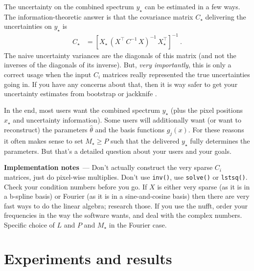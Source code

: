 \documentclass[11pt]{article}
\renewcommand{\paragraph}[1]{\medskip\par\noindent\textbf{#1}~---}
\begin{document}
The uncertainty on the combined spectrum $y_\star$ can be estimated in a few ways.
The information-theoretic answer is that the covariance matrix $C_\star$ delivering the uncertainties on $y_\star$ is
\begin{align}
    C_\star &= [X_\star\,(X^\top\,C^{-1}\,X)^{-1}\,X_\star^\top]^{-1} ~.
\end{align}
The naive uncertainty variances are the diagonals of this matrix (and not the inverses of the diagonals of its inverse).
But, \emph{very importantly}, this is only a correct usage when the input $C_i$ matrices really represented the true uncertainties going in.
If you have any concerns about that, then it is way safer to get your uncertainty estimates from bootstrap or jackknife \cite{hoggflexible}.

In the end, most users want the combined spectrum $y_\star$ (plus the pixel positions $x_\star$ and uncertainty information).
Some users will additionally want (or want to reconstruct) the parameters $\hat\theta$ and the basis functions $g_j(x)$.
For these reasons it often makes sense to set $M_\star\geq P$ such that the delivered $y_\star$ fully determines the parameters.
But that's a detailed question about your users and your goals.

\paragraph{Implementation notes}
Don't actually construct the very sparse $C_i$ matrices, just do pixel-wise multiplies.
Don't use \texttt{inv()}, use \texttt{solve()} or \texttt{lstsq()}.
Check your condition numbers before you go.
If $X$ is either very sparse (as it is in a b-spline basis) or Fourier (as it is in a sine-and-cosine basis) then there are very fast ways to do the linear algebra; research those.
If you use the nufft, order your frequencies in the way the software wants, and deal with the complex numbers.
Specific choice of $L$ and $P$ and $M_\star$ in the Fourier case.

\section{Experiments and results}
\end{document}
